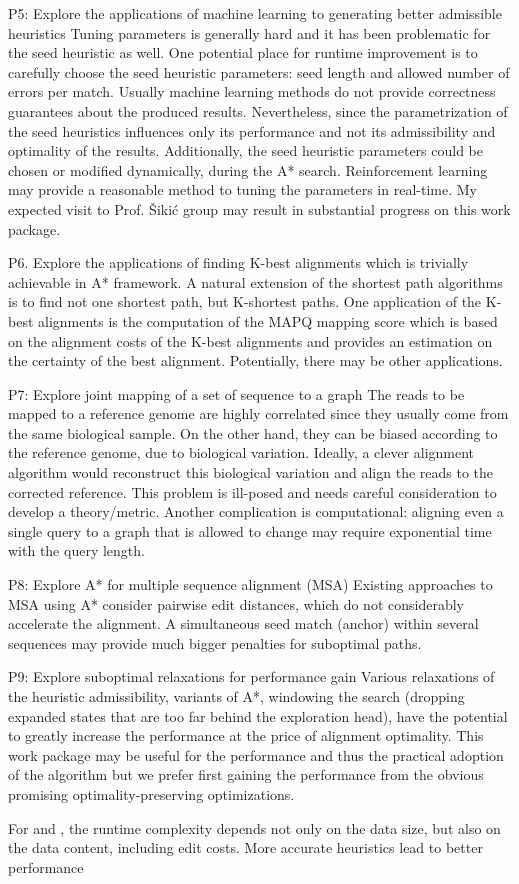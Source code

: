 P5: Explore the applications of machine learning to generating better admissible
heuristics Tuning parameters is generally hard and it has been problematic for
the seed heuristic as well. One potential place for runtime improvement is to
carefully choose the seed heuristic parameters: seed length and allowed number
of errors per match. Usually machine learning methods do not provide correctness
guarantees about the produced results. Nevertheless, since the parametrization
of the seed heuristics influences only its performance and not its admissibility
and optimality of the results. Additionally, the seed heuristic parameters could
be chosen or modified dynamically, during the A* search. Reinforcement learning
may provide a reasonable method to tuning the parameters in real-time. My
expected visit to Prof. Šikić group may result in substantial progress on this
work package.

P6. Explore the applications of finding K-best alignments which is trivially achievable in A* framework. 
A natural extension of the shortest path algorithms is to find not one shortest path, but K-shortest paths. One application of the K-best alignments is the computation of the MAPQ mapping score which is based on the alignment costs of the K-best alignments and provides an estimation on the certainty of the best alignment. Potentially, there may be other applications.

P7: Explore joint mapping of a set of sequence to a graph
The reads to be mapped to a reference genome are highly correlated since they usually come from the same biological sample. On the other hand, they can be biased according to the reference genome, due to biological variation. Ideally, a clever alignment algorithm would reconstruct this biological variation and align the reads to the corrected reference. This problem is ill-posed and needs careful consideration to develop a theory/metric. Another complication is computational: aligning even a single query to a graph that is allowed to change may require exponential time with the query length.

P8: Explore A* for multiple sequence alignment (MSA)
Existing approaches to MSA using A* consider pairwise edit distances, which do not considerably accelerate the alignment. A simultaneous seed match (anchor) within several sequences may provide much bigger penalties for suboptimal paths.

P9: Explore suboptimal relaxations for performance gain
Various relaxations of the heuristic admissibility, variants of A*, windowing the search (dropping expanded states that are too far behind the exploration head), have the potential to greatly increase the performance at the price of alignment optimality. This work package may be useful for the performance and thus the practical adoption of the algorithm but we prefer first gaining the performance from the obvious promising optimality-preserving optimizations.

For \dijkstra and \astarix, the runtime complexity depends not only on the data
size, but also on the data content, including edit costs. More accurate
heuristics lead to better \A performance~\cite{pearl_discovery_1983}